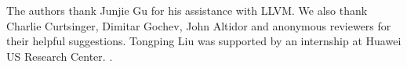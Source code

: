 The authors thank Junjie Gu for his assistance with LLVM. 
We also thank Charlie Curtsinger, Dimitar Gochev, John Altidor and anonymous reviewers for their helpful suggestions. Tongping Liu was supported by an internship at Huawei US Research Center. .  
